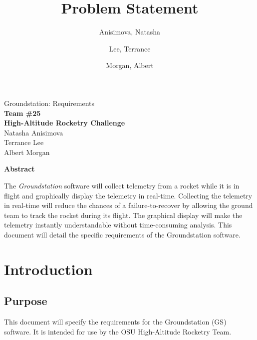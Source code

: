 \documentclass[10pt,draftclsnofoot,onecolumn]{IEEEtran}
\begin{document}
	\singlespace
	
	\title{\vspace{2in}Problem Statement}
	
	\author {
		Anisimova, Natasha
		\and
		Lee, Terrance
		\and
		Morgan, Albert
	}
	
	
	\pagestyle{empty}
	\vspace*{2in}
	\begin{center}
		\huge
		Groundstation: Requirements\\
		\normalsize
		\vspace{5mm}
		\textbf{
			Team \#25\\
			High-Altitude Rocketry Challenge\\
		}
		\vspace{1mm}
		Natasha Anisimova\\
		Terrance Lee\\
		Albert Morgan
	\end{center}
	
	\vspace{5mm}
	
	\begin{center}
		\textbf{Abstract}
	\end{center}
	
	
	The \textit{Groundstation} software will collect telemetry from a rocket while it is in flight and graphically display the telemetry in real-time.
	Collecting the telemetry in real-time will reduce the chances of a failure-to-recover by allowing the ground team to track the rocket during its flight.
	The graphical display will make the telemetry instantly understandable without time-consuming analysis.
	This document will detail the specific requirements of the Groundstation software.

	
	
	\newpage
	
	\tableofcontents
	\newpage
	
	\pagestyle{headings}


	\section{Introduction}
	
	\subsection{Purpose}
	This document will specify the requirements for the Groundstation (GS) software.
	It is intended for use by the OSU High-Altitude Rocketry Team.
	
\end{document}
